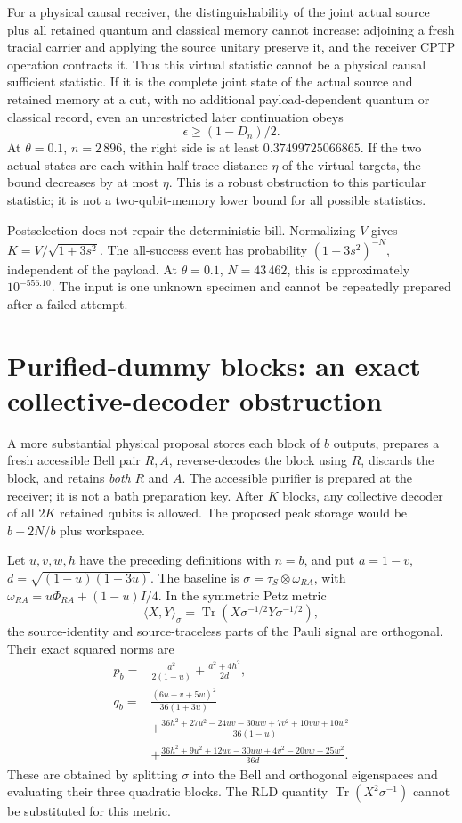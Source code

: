 \documentclass[11pt]{article}
\newcommand{\Tr}{\operatorname{Tr}}
\begin{document}
For a physical causal receiver, the distinguishability of the joint actual
source plus all retained quantum and classical memory cannot increase:
adjoining a fresh tracial carrier and applying the source unitary preserve it,
and the receiver CPTP operation contracts it. Thus this virtual statistic
cannot be a physical causal sufficient statistic. If it is the complete joint
state of the actual source and retained memory at a cut, with no additional
payload-dependent quantum or classical record, even an unrestricted later
continuation obeys
\[
 \epsilon\ge(1-D_n)/2.
\]
At $\theta=0.1$, $n=2\,896$, the right side is at least
$0.37499725066865$. If the two actual states are each within half-trace
distance $\eta$ of the virtual targets, the bound decreases by at most
$\eta$. This is a robust obstruction to this particular statistic; it is
not a two-qubit-memory lower bound for all possible statistics.

Postselection does not repair the deterministic bill. Normalizing $V$ gives
$K=V/\sqrt{1+3s^2}$. The all-success event has probability
$(1+3s^2)^{-N}$, independent of the payload. At $\theta=0.1$, $N=43\,462$,
this is approximately $10^{-556.10}$. The input is one unknown specimen and
cannot be repeatedly prepared after a failed attempt.

\section{Purified-dummy blocks: an exact collective-decoder obstruction}

A more substantial physical proposal stores each block of $b$ outputs,
prepares a fresh accessible Bell pair $R,A$, reverse-decodes the block using
$R$, discards the block, and retains \emph{both} $R$ and $A$. The accessible
purifier is prepared at the receiver; it is not a bath preparation key.
After $K$ blocks, any collective decoder of all $2K$ retained qubits is
allowed. The proposed peak storage would be $b+2N/b$ plus workspace.

Let $u,v,w,h$ have the preceding definitions with $n=b$, and put
$a=1-v$, $d=\sqrt{(1-u)(1+3u)}$. The baseline is
$\sigma=\tau_S\otimes\omega_{RA}$, with
$\omega_{RA}=u\Phi_{RA}+(1-u)I/4$. In the symmetric Petz metric
\[
 \langle X,Y\rangle_\sigma
 =\Tr(X\sigma^{-1/2}Y\sigma^{-1/2}),
\]
the source-identity and source-traceless parts of the Pauli signal are
orthogonal. Their exact squared norms are
\begin{align}
 p_b={}&\frac{a^2}{2(1-u)}+\frac{a^2+4h^2}{2d},\\
 q_b={}&\frac{(6u+v+5w)^2}{36(1+3u)}\nonumber\\
 &+\frac{36h^2+27u^2-24uv-30uw+7v^2+10vw+10w^2}{36(1-u)}\nonumber\\
 &+\frac{36h^2+9u^2+12uv-30uw+4v^2-20vw+25w^2}{36d}.
 \label{eq:blockpq}
\end{align}
These are obtained by splitting $\sigma$ into the Bell and orthogonal
eigenspaces and evaluating their three quadratic blocks. The RLD quantity
$\Tr(X^2\sigma^{-1})$ cannot be substituted for this metric.
\end{document}
